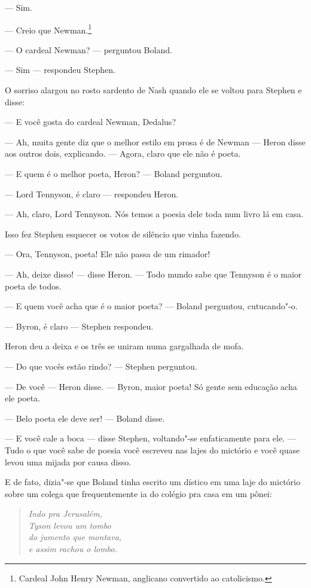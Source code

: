  --- Sim.

 --- Creio que Newman.\footnote{ Cardeal John Henry Newman,
 anglicano convertido ao catolicismo.}

 --- O cardeal Newman? --- perguntou Boland.

 --- Sim --- respondeu Stephen.

O sorriso alargou no rosto sardento de Nash quando ele se voltou para
Stephen e disse:

--- E você gosta do cardeal Newman, Dedalus?

 --- Ah, muita gente diz que o melhor estilo em prosa é de Newman --- Heron
disse aos outros dois, explicando. --- Agora, claro que ele não é poeta.

 --- E quem é o melhor poeta, Heron? --- Boland perguntou.

 --- Lord Tennyson, é claro --- respondeu Heron.

 --- Ah, claro, Lord Tennyson. Nós temos a poesia dele toda num livro lá
em casa.

Isso fez Stephen esquecer os votos de silêncio que vinha fazendo.

 --- Ora, Tennyson, poeta! Ele não passa de um rimador!

 --- Ah, deixe disso! --- disse Heron. --- Todo mundo sabe que Tennyson é o maior
poeta de todos.

 --- E quem você acha que é o maior poeta? --- Boland perguntou, cutucando"-o.

 --- Byron, é claro --- Stephen respondeu.

Heron deu a deixa e os três se uniram numa gargalhada de mofa.

 --- Do que vocês estão rindo? --- Stephen perguntou.

 --- De você --- Heron disse. --- Byron, maior poeta! Só gente sem educação acha
ele poeta.

 --- Belo poeta ele deve ser! --- Boland disse.

 --- E você cale a boca --- disse Stephen, voltando"-se enfaticamente para ele.
 --- Tudo o que você sabe de poesia você escreveu nas lajes do mictório e você quase levou uma mijada por causa disso.

E de fato, dizia"-se que Boland tinha escrito um dístico em uma laje do
mictório sobre um colega que frequentemente ia do colégio pra casa em
um pônei:

\begin{verse}\itshape
Indo pra Jerusalém,\\ 
Tyson levou um tombo\\
do jumento que montava,\\ 
e assim rachou o lombo.
\end{verse}

